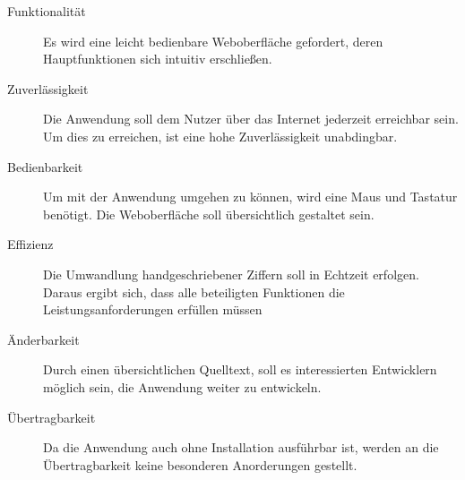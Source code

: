 \begin{description}
\item[Funktionalität]
Es wird eine leicht bedienbare Weboberfläche gefordert, deren Hauptfunktionen sich intuitiv erschließen.
\item[Zuverlässigkeit]
Die Anwendung soll dem Nutzer über das Internet jederzeit erreichbar sein. Um dies zu erreichen, ist eine hohe Zuverlässigkeit unabdingbar.
\item[Bedienbarkeit]
Um mit der Anwendung umgehen zu können, wird eine Maus und Tastatur benötigt. Die Weboberfläche soll übersichtlich gestaltet sein.
\item[Effizienz]
Die Umwandlung handgeschriebener Ziffern soll in Echtzeit erfolgen. Daraus ergibt sich, dass alle beteiligten Funktionen die Leistungsanforderungen erfüllen müssen
\item[Änderbarkeit]
Durch einen übersichtlichen Quelltext, soll es interessierten Entwicklern möglich sein, die Anwendung weiter zu entwickeln.
\item[Übertragbarkeit]
Da die Anwendung auch ohne Installation ausführbar ist, werden an die Übertragbarkeit keine besonderen Anorderungen gestellt.
\end{description}
